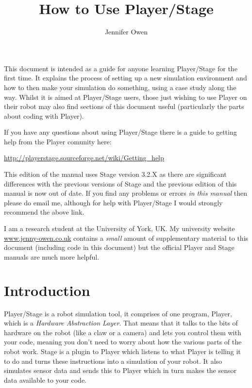 \documentclass[a4paper]{report}
\title{How to Use Player/Stage}
\author{Jennifer Owen}
\newcommand{\plst}{Player/Stage\xspace}
\newcommand{\pl}{Player\xspace}
\begin{document}
\maketitle

This document is intended as a guide for anyone learning \plst for the first time. It explains the process of setting up a new simulation environment and how to then make your simulation do something, using a case study along the way. Whilst it is aimed at \plst users, those just wishing to use \pl on their robot may also find sections of this document useful (particularly the parts about coding with Player).

If you have any questions about using \plst there is a guide to getting help from the \pl comunity here:
\begin{center}
	\url{http://playerstage.sourceforge.net/wiki/Getting_help}
\end{center}
This edition of the manual uses Stage version 3.2.X as there are significant differences with the previous versions of Stage and the previous edition of this manual is now out of date. If you find any problems or errors \emph{in this manual} then please do email me, although for help with Player/Stage I would strongly recommend the above link. 

I am a research student at the University of York, UK. My university website \url{www.jenny-owen.co.uk} contains a \textit{small} amount of supplementary material to this document (including code in this document) but the official Player and Stage manuals are much more helpful.


\newpage
\tableofcontents

\newpage
\chapter{Introduction}
\plst is a robot simulation tool, it comprises of one program, \pl, which is a \emph{Hardware Abstraction Layer}. That means that it talks to the bits of hardware on the robot (like a claw or a camera) and lets you control them with your code, meaning you don't need to worry about how the various parts of the robot work. Stage is a plugin to \pl which listens to what \pl is telling it to do and turns these instructions into a simulation of your robot. It also simulates sensor data and sends this to \pl which in turn makes the sensor data available to your code.
\end{document}
